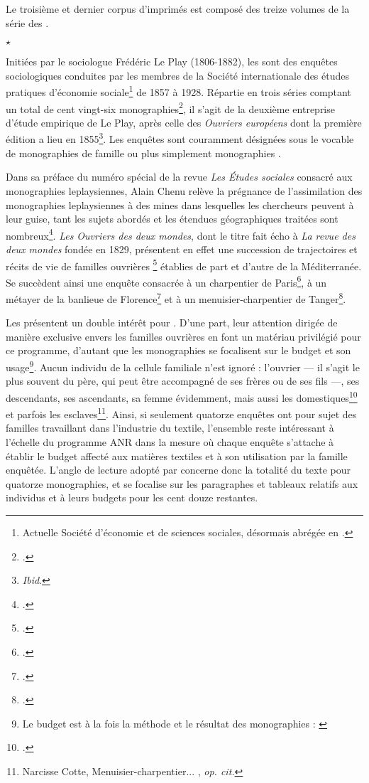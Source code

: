 Le troisième et dernier corpus d'imprimés est composé des treize volumes de la série des \odm.

\begin{center}
$\star$
\end{center} 

Initiées par le sociologue Frédéric Le Play (1806-1882), les \odm{} sont des enquêtes sociologiques conduites par les membres de la Société internationale des études pratiques d’économie sociale\footnote{Actuelle Société d'économie et de sciences sociales, désormais abrégée en \sess.} de 1857 à 1928. Répartie en trois séries comptant un total de cent vingt-six monographies\footnote{\cite[p. 95]{lorry}.}, il s'agit de la deuxième entreprise d'étude empirique de Le Play, après celle des \textit{Ouvriers européens} dont la première édition a lieu en 1855\footnote{\textit{Ibid}.}. Les enquêtes sont couramment désignées sous le vocable de \og monographies de famille \fg{} ou plus simplement \og monographies \fg{}.

Dans sa préface du numéro spécial de la revue \textit{Les Études sociales} consacré aux monographies leplaysiennes, Alain Chenu relève la prégnance de l'assimilation des monographies leplaysiennes à des \og mines \fg{} dans lesquelles les chercheurs peuvent \og [puiser] \fg{} à leur guise, tant les sujets abordés et les étendues géographiques traitées sont nombreux\footnote{\cite[p. 5]{chenu}.}. \textit{Les Ouvriers des deux mondes}, dont le titre fait écho à \textit{La revue des deux mondes} fondée en 1829, présentent en effet une succession de \og trajectoires et récits de vie de familles ouvrières \fg{}\footnote{\cite[p. 193]{baciocchi}.} établies de part et d'autre de la Méditerranée. Se succèdent ainsi une enquête consacrée à un charpentier de Paris\footcite{mono001a}, à un métayer de la banlieue de Florence\footcite{mono005a} et à un menuisier-charpentier de Tanger\footcite{mono012a}.

Les \odm{} présentent un double intérêt pour \timeus. D'une part, leur attention dirigée de manière exclusive envers les familles ouvrières en font un matériau privilégié pour ce programme, d'autant que les monographies se focalisent sur le budget et son usage\footnote{Le budget est \og à la fois la méthode et le résultat \fg{} des monographies : \cite[p. 11]{cardoni}}. Aucun individu de la cellule familiale n'est ignoré : l'ouvrier --- il s'agit le plus souvent du père, qui peut être accompagné de ses frères ou de ses fils ---, ses descendants, ses ascendants, sa femme évidemment, mais aussi les domestiques\footcite{mono018a} et parfois les esclaves\footnote{Narcisse Cotte, \og Menuisier-charpentier... \fg{}, \textit{op. cit.}}. Ainsi, si seulement quatorze enquêtes ont pour sujet des familles travaillant dans l'industrie du textile, l'ensemble reste intéressant à l'échelle du programme ANR dans la mesure où chaque enquête s'attache à établir le budget affecté aux matières textiles et à son utilisation par la famille enquêtée. L'angle de lecture adopté par \timeus{} concerne donc la totalité du texte pour quatorze monographies, et se focalise sur les paragraphes et tableaux relatifs aux individus et à leurs budgets pour les cent douze restantes.

